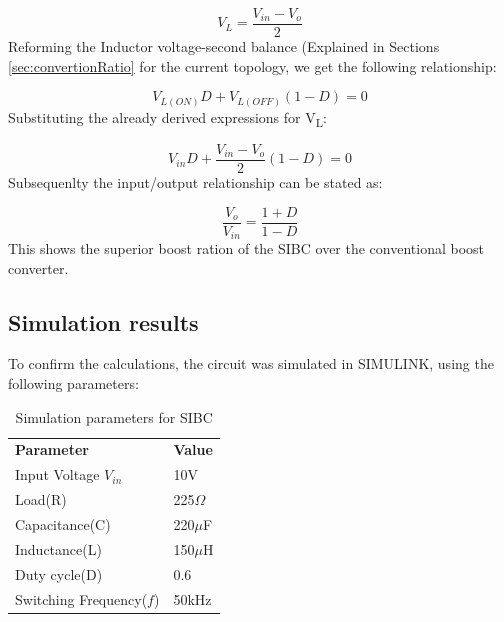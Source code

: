 \begin{equation}
	V_L=\frac{V_{in} - V_o}{2}
	\label{eq:SI_KVL_OFF2}
\end{equation}
Reforming the Inductor voltage-second balance (Explained in Sections \ref{sec:convertionRatio} for the current topology, we get the following relationship:

\begin{equation}
	V_{L(ON)}D+V_{L(OFF)}(1-D)=0
	\label{eq:SI_IVSB}
\end{equation}
Substituting the already derived expressions for V\textsubscript{L}:

\begin{equation}
	V_{in}D+\frac{V_{in} - V_o}{2}(1-D)=0
	\label{eq:SI_IVSB2}
\end{equation}
Subsequenlty the input/output relationship can be stated as:

\begin{equation}
	\frac{V_o}{V_{in}} = \frac{1+D}{1-D}
	\label{eq:SI_VO_VIN}
\end{equation}
This shows the superior boost ration of the SIBC over the conventional boost converter. 

\subsection{Simulation results}

To confirm the calculations, the circuit was simulated in SIMULINK, using the following parameters: 

\begin{table}[H]
\begin{center}
\caption {Simulation parameters for SIBC} \label{tab:SI} 
\begin{tabular}{|l|l|}
\cline{1-2}
\textbf{Parameter} & \textbf{Value}  \\ \cline{1-2}
Input Voltage $V_{in}$          &      10V   \\ \cline{1-2}
Load(R)   & 225$\Omega$           \\ \cline{1-2}
Capacitance(C)          &       220$\mu$F     \\ \cline{1-2}
Inductance(L)          &      150$\mu$H      \\ \cline{1-2}
Duty cycle(D)          &     0.6       \\ \cline{1-2}
Switching Frequency($f$)          &      50kHz      \\ \cline{1-2}
\end{tabular}
\end{center}
\end{table}

